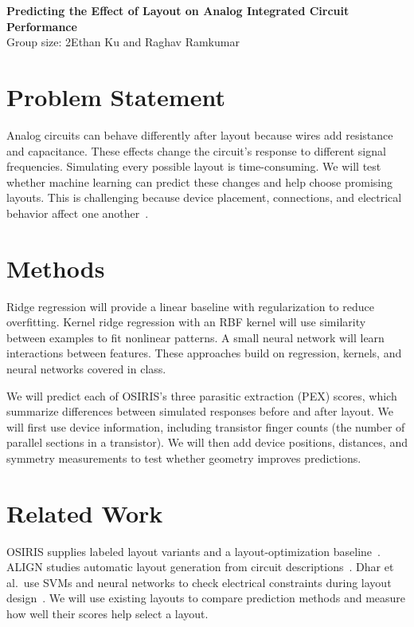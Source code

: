 \documentclass[11pt,letterpaper]{article}
\newcommand{\groupsize}{2}
\newcommand{\groupmembers}{Ethan Ku and Raghav Ramkumar}
\begin{document}
\begin{center}
    {\large\bfseries Predicting the Effect of Layout on Analog Integrated Circuit Performance}\\[5pt]
    Group size: \groupsize \qquad \groupmembers
\end{center}

\section*{Problem Statement}

Analog circuits can behave differently after layout because wires add resistance
and capacitance. These effects change the circuit's response to different signal
frequencies. Simulating every possible layout is time-consuming. We will test
whether machine learning can predict these changes and help choose promising
layouts. This is challenging because device placement, connections, and electrical
behavior affect one another~\cite{osiris}.

\section*{Methods}

Ridge regression will provide a linear baseline with regularization to reduce
overfitting. Kernel ridge regression with an RBF kernel will use similarity
between examples to fit nonlinear patterns. A small neural network will learn
interactions between features. These approaches build on regression, kernels,
and neural networks covered in class.

We will predict each of OSIRIS's three parasitic extraction (PEX) scores, which
summarize differences between simulated responses before and after layout.
We will first use device information, including transistor finger counts
(the number of parallel sections in a transistor). We will then add device
positions, distances, and symmetry measurements to test whether geometry
improves predictions.

\section*{Related Work}

OSIRIS supplies labeled layout variants and a layout-optimization
baseline~\cite{osiris}. ALIGN studies automatic layout generation from circuit
descriptions~\cite{align}. Dhar et al.\ use SVMs and neural networks to check
electrical constraints during layout design~\cite{dhar}. We will use existing
layouts to compare prediction methods and measure how well their scores help
select a layout.
\end{document}
